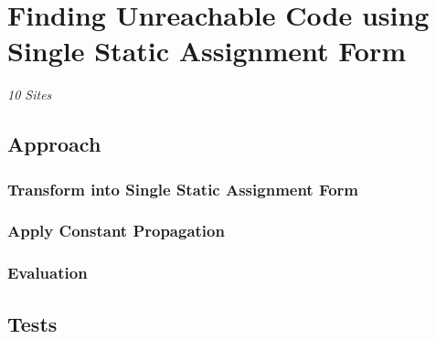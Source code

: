 \chapter{Finding Unreachable Code using Single Static Assignment Form}
\label{cha:state of the art}
\emph{10 Sites}
\section{Approach}
\subsection{Transform into Single Static Assignment Form}
\subsection{Apply Constant Propagation}
\subsection{Evaluation}
\section{Tests}

